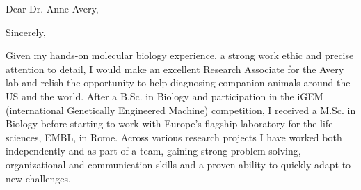 \documentclass[11pt,a4paper,sans]{moderncv}
\begin{document}
\thispagestyle{titlepage}
\date{\today}
\opening{Dear Dr. Anne Avery,}
\closing{Sincerely,}
\makelettertitle
\begin{spacing}{1.1}

Given my hands-on molecular biology experience, a strong work ethic and precise attention to detail, I would make an excellent Research Associate for the Avery lab and relish the opportunity to help diagnosing companion animals around the US and the world. 
After a B.Sc. in Biology and participation in the iGEM (international Genetically Engineered Machine) competition, I received a M.Sc. in Biology before starting to work with Europe's flagship laboratory for the life sciences, EMBL, in Rome. 
Across various research projects I have worked both independently and as part of a team, gaining strong problem-solving, organizational and communication skills and a proven ability to quickly adapt to new challenges.
\par%


\end{spacing}
\end{document}
